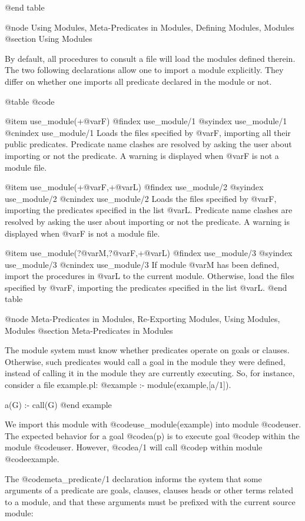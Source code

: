{{{{@end table

@node Using Modules, Meta-Predicates in Modules, Defining Modules, Modules
@section Using Modules

By default, all procedures to consult a file will load the modules
defined therein. The two following declarations allow one to import a
module explicitly. They differ on whether one imports all predicate
declared in the module or not.

@table @code

@item use_module(+@var{F})
@findex use_module/1
@syindex use_module/1
@cnindex use_module/1
Loads the files specified by @var{F}, importing all their public
predicates. Predicate name clashes are resolved by asking the user about
importing or not the predicate. A warning is displayed when @var{F} is
not a module file.

@item use_module(+@var{F},+@var{L})
@findex use_module/2
@syindex use_module/2
@cnindex use_module/2
Loads the files specified by @var{F}, importing the predicates specified
in the list @var{L}. Predicate name clashes are resolved by asking the
user about importing or not the predicate. A warning is displayed when
@var{F} is not a module file.

@item use_module(?@var{M},?@var{F},+@var{L})
@findex use_module/3
@syindex use_module/3
@cnindex use_module/3
If module @var{M} has been defined, import the procedures in @var{L} to
the current module. Otherwise, load the files specified by @var{F},
importing the predicates specified in the list @var{L}. 
@end table


@node Meta-Predicates in Modules, Re-Exporting Modules, Using Modules, Modules
@section Meta-Predicates in Modules

The module system must know whether predicates operate on goals or
clauses. Otherwise, such predicates would call a goal in the module they
were defined, instead of calling it in the module they are currently
executing. So, for instance, consider a file example.pl:
@example
:- module(example,[a/1]).

a(G) :- call(G)
@end example

We import this module with @code{use_module(example)} into module
@code{user}.  The expected behavior for a goal @code{a(p)} is to
execute goal @code{p} within the module @code{user}. However,
@code{a/1} will call @code{p} within module @code{example}.

The @code{meta_predicate/1} declaration informs the system that some
arguments of a predicate are goals, clauses, clauses heads or other
terms related to a module, and that these arguments must be prefixed
with the current source module:

}}}}
